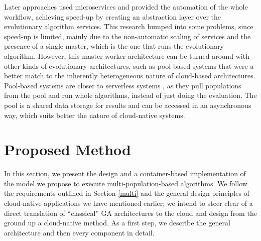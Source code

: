 \documentclass[review]{elsarticle}
\begin{document}
Later approaches used microservices \cite{khalloof2018generic} and 
provided the automation of the whole workflow\cite{salza2019speed}, 
achieving speed-up by creating an abstraction layer over the 
evolutionary algorithm services.
This research bumped into some problems, since speed-up is limited, mainly due to the
non-automatic scaling of services and the presence of a single
master, which is the one that runs the evolutionary
algorithm. However, this master-worker architecture can be turned
around with other kinds of evolutionary architectures, such
as pool-based systems
\cite{valenzuela2015implementing,merelo2012sofea,sofea:cec2012} that were 
a better match to the inherently heterogeneous nature of cloud-based
architectures. Pool-based systems are closer to serverless systems
\cite{malawski2017serverless}, as they pull populations from the pool and run
whole algorithms, instead of just doing the evaluation. The pool 
is a shared data storage for results and can be accessed in an
asynchronous way, which suits better the nature of cloud-native systems.

\section{Proposed Method} 
\label{method} 

In this section, we present the design
and a container-based implementation of the model we propose to execute
multi-population-based algorithms. We follow the requirements outlined in
Section \ref{multi} and the general design principles of cloud-native
applications we have mentioned earlier; we intend to steer
clear of a direct translation of ``classical'' GA architectures to the
cloud and design from the ground up a cloud-native method. As a first step, we describe the general
architecture and then every component in detail. 
\end{document}

